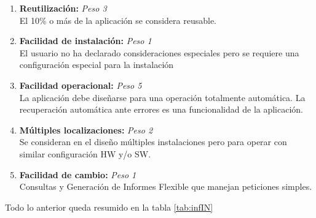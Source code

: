 \documentclass[11pt,a4paper,spanish,twoside]{book}
\begin{document}
\begin{enumerate}[{\bf 1.}]
\item {\bf Reutilización:} \emph{Peso 3} \\ El 10\% o más de la aplicación se
  considera reusable. 

\item {\bf Facilidad de instalación:} \emph{Peso 1} \\ El usuario no ha
  declarado consideraciones especiales pero se requiere una configuración
  especial para la instalación 

\item {\bf Facilidad operacional:} \emph{Peso 5} \\ La aplicación debe diseñarse
  para una operación totalmente automática. La recuperación automática ante
  errores es una funcionalidad de la aplicación. 

\item {\bf Múltiples localizaciones:} \emph{Peso 2} \\ Se consideran en el
  diseño múltiples instalaciones pero para operar con similar configuración
  HW y/o SW. 

\item {\bf Facilidad de cambio:} \emph{Peso 1} \\ Consultas y Generación de
  Informes Flexible que manejan peticiones simples.
\end{enumerate}

Todo lo anterior queda resumido en la tabla \ref{tab:infIN}
\end{document}
